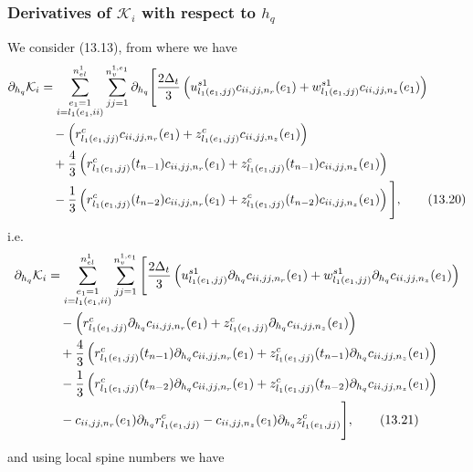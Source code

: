 \documentclass{article}
\begin{document}
\subsubsection{Derivatives of $\mathcal{K}_i$ with respect to $h_q$} %
We consider (13.13), from where we have
\begin{align}
\partial_{h_q} \mathcal{K}_i &= \sum_{\substack{e_1=1\\ i=l_1(e_1,ii)}}^{n_{el}^1} \sum_{jj=1}^{n_v^{1,e_1}} \partial_{h_q} \Bigg[ \frac{2\Delta_t}{3} \left( u_{l_1(e_1,jj)}^{s1} c_{ii,jj,n_r}(e_1) + w_{l_1(e_1,jj)}^{s1} c_{ii,jj,n_z}(e_1) \right) \nonumber\\
&\quad - \left( r_{l_1(e_1,jj)}^c c_{ii,jj,n_r}(e_1) + z_{l_1(e_1,jj)}^c c_{ii,jj,n_z}(e_1) \right) \nonumber\\
&\quad + \frac{4}{3} \left( r_{l_1(e_1,jj)}^c(t_{n-1}) c_{ii,jj,n_r}(e_1) + z_{l_1(e_1,jj)}^c(t_{n-1}) c_{ii,jj,n_z}(e_1) \right) \nonumber\\
&\quad - \frac{1}{3} \left( r_{l_1(e_1,jj)}^c(t_{n-2}) c_{ii,jj,n_r}(e_1) + z_{l_1(e_1,jj)}^c(t_{n-2}) c_{ii,jj,n_z}(e_1) \right) \Bigg], \tag{13.20}
\end{align}
i.e.
\begin{align}
\partial_{h_q} \mathcal{K}_i &= \sum_{\substack{e_1=1\\ i=l_1(e_1,ii)}}^{n_{el}^1} \sum_{jj=1}^{n_v^{1,e_1}} \Bigg[ \frac{2\Delta_t}{3} \left( u_{l_1(e_1,jj)}^{s1} \partial_{h_q} c_{ii,jj,n_r}(e_1) + w_{l_1(e_1,jj)}^{s1} \partial_{h_q} c_{ii,jj,n_z}(e_1) \right) \nonumber\\
&\quad - \left( r_{l_1(e_1,jj)}^c \partial_{h_q} c_{ii,jj,n_r}(e_1) + z_{l_1(e_1,jj)}^c \partial_{h_q} c_{ii,jj,n_z}(e_1) \right) \nonumber\\
&\quad + \frac{4}{3} \left( r_{l_1(e_1,jj)}^c(t_{n-1}) \partial_{h_q} c_{ii,jj,n_r}(e_1) + z_{l_1(e_1,jj)}^c(t_{n-1}) \partial_{h_q} c_{ii,jj,n_z}(e_1) \right) \nonumber\\
&\quad - \frac{1}{3} \left( r_{l_1(e_1,jj)}^c(t_{n-2}) \partial_{h_q} c_{ii,jj,n_r}(e_1) + z_{l_1(e_1,jj)}^c(t_{n-2}) \partial_{h_q} c_{ii,jj,n_z}(e_1) \right) \nonumber\\
&\quad - c_{ii,jj,n_r}(e_1) \partial_{h_q} r_{l_1(e_1,jj)}^c - c_{ii,jj,n_z}(e_1) \partial_{h_q} z_{l_1(e_1,jj)}^c \Bigg], \tag{13.21}
\end{align}
and using local spine numbers we have
\end{document}
